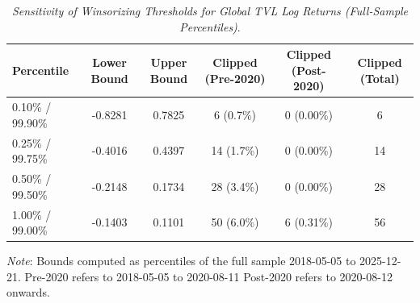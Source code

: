 \begin{table}[h]
  \centering
  \caption{\textit{Sensitivity of Winsorizing Thresholds for Global TVL Log Returns (Full-Sample Percentiles)}.}
  \label{tab:winsortvl20182025}
  \begin{tabular}{lccccc}
    \toprule
    \textbf{Percentile} & \textbf{Lower Bound} & \textbf{Upper Bound} & \textbf{Clipped (Pre-2020)} & \textbf{Clipped (Post-2020)} & \textbf{Clipped (Total)} \\ 
    \midrule
    0.10\% / 99.90\% & -0.8281 & 0.7825 & 6 (0.7\%) & 0 (0.00\%) & 6 \\ 
    0.25\% / 99.75\% & -0.4016 & 0.4397 & 14 (1.7\%) & 0 (0.00\%) & 14 \\ 
    0.50\% / 99.50\% & -0.2148 & 0.1734 & 28 (3.4\%) & 0 (0.00\%) & 28 \\ 
    1.00\% / 99.00\% & -0.1403 & 0.1101 & 50 (6.0\%) & 6 (0.31\%) & 56 \\ 
    \bottomrule
  \end{tabular}
  \vspace{2pt}
  \footnotesize{\textit{Note}: Bounds computed as percentiles of the full sample 2018-05-05 to 2025-12-21. Pre-2020 refers to 2018-05-05 to 2020-08-11 Post-2020 refers to 2020-08-12 onwards.}\\
\end{table}